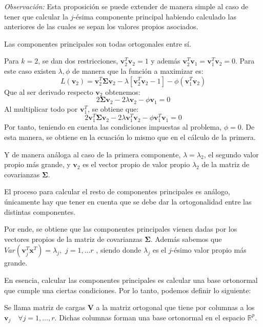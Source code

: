 \noindent \emph{Observación: } Esta proposición se puede extender de manera simple al caso de tener que calcular la $j$-ésima componente principal habiendo calculado las anteriores de las cuales se sepan los valores propios asociados. 

\begin{coro}
Las componentes principales son todas ortogonales entre sí. 
\end{coro}

\noindent Para $k=2$, se dan dos restricciones, $\textbf{v}_2^T\textbf{v}_2=1$ y además $\textbf{v}_2^T \textbf{v}_1=\textbf{v}_1^T \textbf{v}_2=0$. Para este caso existen $\lambda, \phi$ de manera que la función a maximizar es:
\begin{equation}
 L(\textbf{v}_2)=\textbf{v}_2^T \mathbf{\Sigma} \textbf{v}_2 - \lambda[\textbf{v}_2^T \textbf{v}_2-1]-\phi(\textbf{v}_1^T \textbf{v}_2)
\end{equation}
Que al ser derivado respecto $\textbf{v}_2$ obtenemos:
\begin{equation}
2\mathbf{\Sigma} \textbf{v}_2 - 2\lambda\textbf{v}_2-\phi \textbf{v}_1=0
\end{equation}
Al multiplicar todo por $\mathbf{v}_1^T$, se obtiene que:
\begin{equation}
2\mathbf{v}_1^T\mathbf{\Sigma}\mathbf{v}_2-2\lambda \mathbf{v}_1^T \mathbf{v}_2-\phi \mathbf{v}_1^T\mathbf{v}_1=0
\end{equation}
\noindent Por tanto, teniendo en cuenta las condiciones impuestas al problema, $\phi=0$. De esta manera, se obtiene en la ecuación lo mismo que en el cálculo de la primera. 

\noindent Y de manera análoga al caso de la primera componente, $\lambda=\lambda_2$, el segundo valor propio más grande, y $\mathbf{v}_2$ es el vector propio de valor propio $\lambda_2$ de la matriz de covarianzas $\mathbf{\Sigma}$.

\noindent El proceso para calcular el resto de componentes principales es análogo, únicamente hay que tener en cuenta que se debe dar la ortogonalidad entre las distintas componentes. 

\noindent Por ende, se obtiene que las componentes principales vienen dadas por los vectores propios de la matriz de covarianzas $\mathbf{\Sigma} $. Además sabemos que $Var(\mathbf{v}_j^T \mathbf{x}^T)=\lambda_j,$ $ j=1,\ldots r$ , siendo donde $\lambda_j$ es el $j$-ésimo valor propio más grande. 

\noindent En esencia, calcular las componentes principales es calcular una base ortonormal que cumple una ciertas condiciones. Por lo tanto, podemos definir lo siguiente: 
\begin{defi}
Se llama matriz de cargas $\mathbf{V}$ a la matriz ortogonal que tiene por columnas a los $\mathbf{v}_j\quad \forall j=1,\ldots, r$. Dichas columnas forman una base ortonormal en el espacio $\mathbb{R}^p$.
\end{defi}

